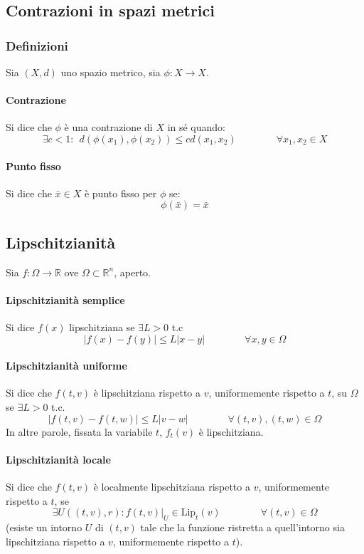 \documentclass[a4paper,12pt]{article}
\begin{document}
\subsection{Contrazioni in spazi metrici}
\subsubsection{Definizioni}
Sia $(X, d)$ uno spazio metrico, sia $\phi : X\rightarrow X$.
\paragraph{Contrazione}
Si dice che $\phi$ è una contrazione di $X$ in sé quando:
$$\exists c < 1:\ \ d(\phi(x_1), \phi(x_2)) \leq cd(x_1, x_2)\qquad\qquad\forall x_1, x_2 \in X$$
\paragraph{Punto fisso}
Si dice che $\bar{x}\in X$ è punto fisso per $\phi$ se:
$$\phi(\bar{x})=\bar{x}$$

\subsection{Lipschitzianità}
Sia $f:\Omega\rightarrow\mathbb{R}$ ove $\Omega\subset\mathbb{R}^n$, aperto.
\paragraph{Lipschitzianità semplice}
Si dice $f\left(x\right)$ lipschitziana se $\exists L>0$ t.c
$$ |f\left(x\right)- f\left(y\right)| \leq L|x-y|\qquad\qquad\forall x,y \in \Omega $$

\paragraph{Lipschitzianità uniforme}
Si dice che $f(t, v)$ è lipschitziana rispetto a $v$, uniformemente rispetto a $t$, su $\Omega$ se $\exists L>0$ t.c.
$$|f(t, v) - f(t, w)| \leq L|v-w|\qquad\qquad\forall (t,v), (t, w) \in \Omega$$
In altre parole, fissata la variabile $t$, $f_t(v)$ è lipschitziana.

\paragraph{Lipschitzianità locale}
Si dice che $f(t, v)$ è localmente lipschitziana rispetto a $v$, uniformemente rispetto a $t$, se
$$\exists U((t, v), r) : f(t, v)|_U \in \text{Lip}_t(v)\qquad\qquad\forall(t, v)\in \Omega$$
(esiste un intorno $U$ di $(t, v)$ tale che la funzione ristretta a quell'intorno sia lipschitziana rispetto a $v$, uniformemente rispetto a $t$).
\end{document}
